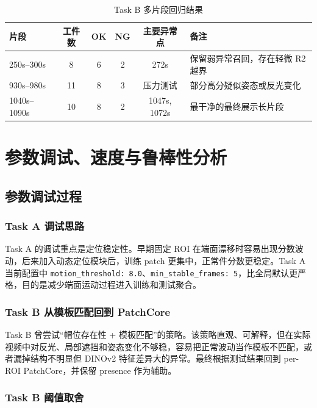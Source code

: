 \documentclass[12pt,hyperref,a4paper,UTF8,fontset=fandol]{ctexart}
\begin{document}
\begin{table}[H]
    \centering
    \begin{tabular}{lccccl}
        \toprule
        片段 & 工件数 & OK & NG & 主要异常点 & 备注 \\
        \midrule
        250s--300s & 8 & 6 & 2 & 272s & 保留弱异常召回，存在轻微 R2 越界 \\
        930s--980s & 11 & 8 & 3 & 压力测试 & 部分高分疑似姿态或反光变化 \\
        1040s--1090s & 10 & 8 & 2 & 1047s, 1072s & 最干净的最终展示长片段 \\
        \bottomrule
    \end{tabular}
    \caption{Task B 多片段回归结果}
\end{table}

\newpage
\section{参数调试、速度与鲁棒性分析}

\subsection{参数调试过程}

\subsubsection{Task A 调试思路}

Task A 的调试重点是定位稳定性。早期固定 ROI 在端面漂移时容易出现分数波动，后来加入动态定位模块后，训练 patch 更集中，正常件分数更稳定。Task A 当前配置中 \texttt{motion\_threshold: 8.0}、\texttt{min\_stable\_frames: 5}，比全局默认更严格，目的是减少端面运动过程进入训练和测试聚合。

\subsubsection{Task B 从模板匹配回到 PatchCore}

Task B 曾尝试“帽位存在性 + 模板匹配”的策略。该策略直观、可解释，但在实际视频中对反光、局部遮挡和姿态变化不够稳，容易把正常波动当作模板不匹配，或者漏掉结构不明显但 DINOv2 特征差异大的异常。最终根据测试结果回到 per-ROI PatchCore，并保留 presence 作为辅助。

\subsubsection{Task B 阈值取舍}
\end{document}
